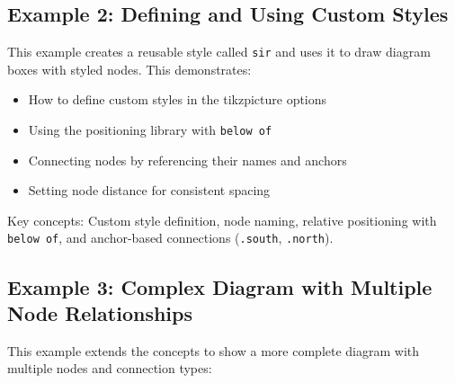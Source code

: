 \documentclass{article}
\begin{document}
\subsection{Example 2: Defining and Using Custom Styles}
This example creates a reusable style called \texttt{sir} and uses it to draw diagram boxes with styled nodes. This demonstrates:
\begin{itemize}
    \item How to define custom styles in the tikzpicture options
    \item Using the positioning library with \texttt{below of}
    \item Connecting nodes by referencing their names and anchors
    \item Setting node distance for consistent spacing
\end{itemize}

\begin{center}
\end{center}

Key concepts: Custom style definition, node naming, relative positioning with \texttt{below of}, and anchor-based connections (\texttt{.south}, \texttt{.north}).

\subsection{Example 3: Complex Diagram with Multiple Node Relationships}
This example extends the concepts to show a more complete diagram with multiple nodes and connection types:
\end{document}
